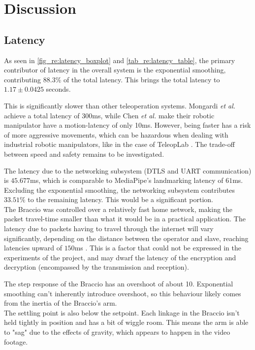 \chapter{Discussion}\label{ch:dis}



\section{Latency}
As seen in \autoref{fig_re:latency_boxplot} and \autoref{tab_re:latency_table}, the primary contributor of latency in the overall system is the exponential smoothing, contributing 88.3\% of the total latency. This brings the total latency to $1.17\pm 0.0425$ seconds.

This is significantly slower than other teleoperation systems. Mongardi \textit{et al.} \cite{bib:braccio_armband_demo} achieve a total latency of 300ms, while Chen \textit{et al.} \cite{bib:teleoperation_TeleopLab} make their robotic manipulator have a motion-latency of only 10ms. However, being faster has a risk of more aggressive movements, which can be hazardous when dealing with industrial robotic manipulators, like in the case of TeleopLab \cite{bib:teleoperation_TeleopLab}. The trade-off between speed and safety remains to be investigated.

The latency due to the networking subsystem (DTLS and UART communication) is $45.677$ms, which is comparable to MediaPipe's landmarking latency of $61$ms. Excluding the exponential smoothing, the networking subsystem contributes $33.51\%$ to the remaining latency. This would be a significant portion.\\
The Braccio was controlled over a relatively fast home network, making the packet travel-time smaller than what it would be in a practical application. The latency due to packets having to travel through the internet will vary significantly, depending on the distance between the operator and slave, reaching latencies upward of $150$ms \cite{bib:world_wide_ping}. This is a factor that could not be expressed in the experiments of the project, and may dwarf the latency of the encryption and decryption (encompassed by the transmission and reception).

The step response of the Braccio has an overshoot of about 10\degree. Exponential smoothing can't inherently introduce overshoot, so this behaviour likely comes from the inertia of the Braccio's arm.\\
The settling point is also below the setpoint. Each linkage in the Braccio isn't held tightly in position and has a bit of wiggle room. This means the arm is able to "sag" due to the effects of gravity, which appears to happen in the video footage.


